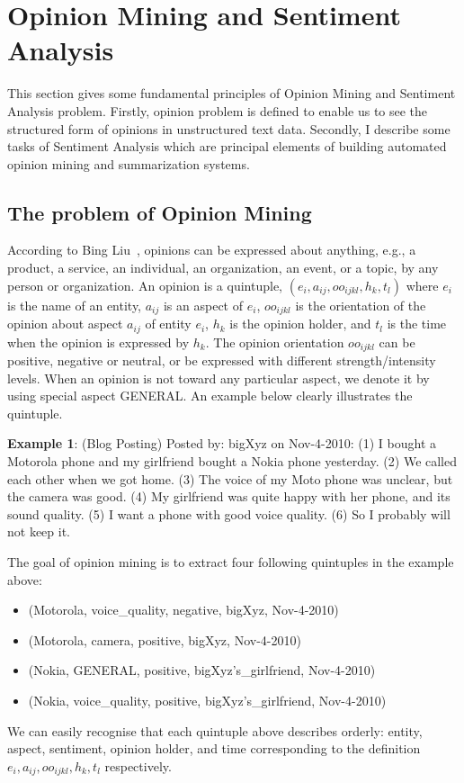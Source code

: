 \documentclass{article}
\begin{document}
\section{Opinion Mining and Sentiment Analysis}
This section gives some fundamental principles of Opinion Mining and Sentiment Analysis problem.
Firstly, opinion problem is defined to enable us to see the structured form of opinions in unstructured text data.
Secondly, I describe some tasks of Sentiment Analysis which are principal elements of building automated opinion mining and summarization systems.

\label{sec:sabackground}
\subsection{The problem of Opinion Mining}
According to Bing Liu~\cite{Liu2012}, opinions can be expressed about anything, e.g., a product, a service, an individual, an organization, an event, or a topic, by any person or organization.
An opinion is a quintuple, $(e_i, a_{ij}, oo_{ijkl}, h_k, t_l)$ where $e_i$ is the name of an entity, $a_{ij}$ is an aspect of $e_i$, $oo_{ijkl}$ is the orientation of the opinion about aspect $a_{ij}$ of entity $e_i$, $h_k$ is the opinion holder, and $t_l$ is the time when the opinion is expressed by $h_k$. 
The opinion orientation $oo_{ijkl}$ can be positive, negative or neutral, or be expressed with different strength/intensity levels. 
When an opinion is not toward any particular aspect, we denote it by using special aspect GENERAL.
An example below clearly illustrates the quintuple.

\textbf{Example 1}:
(Blog Posting) Posted by: bigXyz on Nov-4-2010: 
(1) I bought a Motorola phone and my girlfriend bought a Nokia phone yesterday. 
(2) We called each other when we got home. 
(3) The voice of my Moto phone was unclear, but the camera was good. 
(4) My girlfriend was quite happy with her phone, and its sound quality. 
(5) I want a phone with good voice quality. 
(6) So I probably will not keep it.

The goal of opinion mining is to extract four following quintuples in the example above:
\begin{itemize}
    \item (Motorola, voice\_quality, negative, bigXyz, Nov-4-2010)
    \item (Motorola, camera, positive, bigXyz, Nov-4-2010)
    \item (Nokia, GENERAL, positive, bigXyz's\_girlfriend, Nov-4-2010)
    \item (Nokia, voice\_quality, positive, bigXyz's\_girlfriend, Nov-4-2010)
\end{itemize}
We can easily recognise that each quintuple above describes orderly: entity, aspect, sentiment, opinion holder, and time corresponding to the definition $e_i, a_{ij}, oo_{ijkl}, h_k, t_l$ respectively. 
\end{document}
